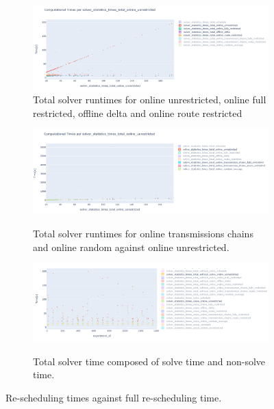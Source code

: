 \documentclass{article}
\begin{document}
\begin{figure}[hbtp]
	\begin{subfigure}{\textwidth}
        \includegraphics[width=\textwidth]{Figures/04_computational_results/times_total_per_times_total_online_unrestricted_1.PNG}
        \caption{Total solver runtimes for online unrestricted, online full restricted, offline delta and online route restricted}
        \label{fig:computationtimes_absolute_1}
    \end{subfigure}

    \begin{subfigure}{\textwidth}
          \includegraphics[width=\textwidth]{Figures/04_computational_results/times_total_per_times_total_online_unrestricted_2.PNG}
          \label{fig:computationtimes_absolute_2}
          \caption{Total solver runtimes for online transmissions chains and online random against online unrestricted.}
     \end{subfigure}
     \begin{subfigure}{\textwidth}
          \includegraphics[width=\textwidth]{Figures/04_computational_results/times_total_solve_non_solve_per_experiment_id.PNG}
          \label{fig:computationtimes_absolute_total_solve_non_solve}
          \caption{Total solver time composed of solve time and non-solve time.}
     \end{subfigure}
	\caption{Re-scheduling times against full re-scheduling time.}
	\label{fig:computationtimes}
\end{figure}
\end{document}
